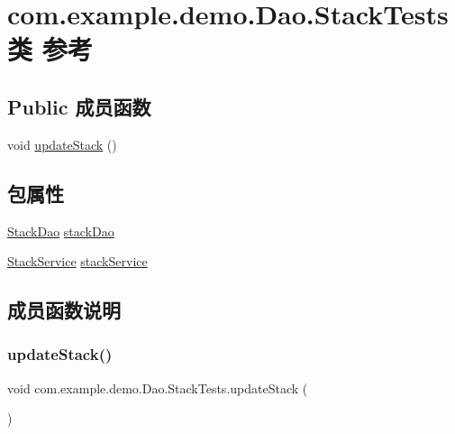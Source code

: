 \hypertarget{classcom_1_1example_1_1demo_1_1_dao_1_1_stack_tests}{}\section{com.\+example.\+demo.\+Dao.\+Stack\+Tests类 参考}
\label{classcom_1_1example_1_1demo_1_1_dao_1_1_stack_tests}
\subsection*{Public 成员函数}
\begin{DoxyCompactItemize}
\item 
void \mbox{\hyperlink{classcom_1_1example_1_1demo_1_1_dao_1_1_stack_tests_aaf4e8aedfbdaf0faab31b2eca48e7c7c}{update\+Stack}} ()
\end{DoxyCompactItemize}
\subsection*{包属性}
\begin{DoxyCompactItemize}
\item 
\mbox{\hyperlink{interfacecom_1_1example_1_1demo_1_1dao_1_1_stack_dao}{Stack\+Dao}} \mbox{\hyperlink{classcom_1_1example_1_1demo_1_1_dao_1_1_stack_tests_a9384e4163467ff0ebe1679ec9066ec4c}{stack\+Dao}}
\item 
\mbox{\hyperlink{classcom_1_1example_1_1demo_1_1service_1_1_stack_service}{Stack\+Service}} \mbox{\hyperlink{classcom_1_1example_1_1demo_1_1_dao_1_1_stack_tests_a044427f96c60db9a425c4c4a706e785a}{stack\+Service}}
\end{DoxyCompactItemize}


\subsection{成员函数说明}
\mbox{\label{classcom_1_1example_1_1demo_1_1_dao_1_1_stack_tests_aaf4e8aedfbdaf0faab31b2eca48e7c7c}} 
\subsubsection{\texorpdfstring{update\+Stack()}{updateStack()}}
{\footnotesize\ttfamily void com.\+example.\+demo.\+Dao.\+Stack\+Tests.\+update\+Stack (\begin{DoxyParamCaption}{ }\end{DoxyParamCaption})}



